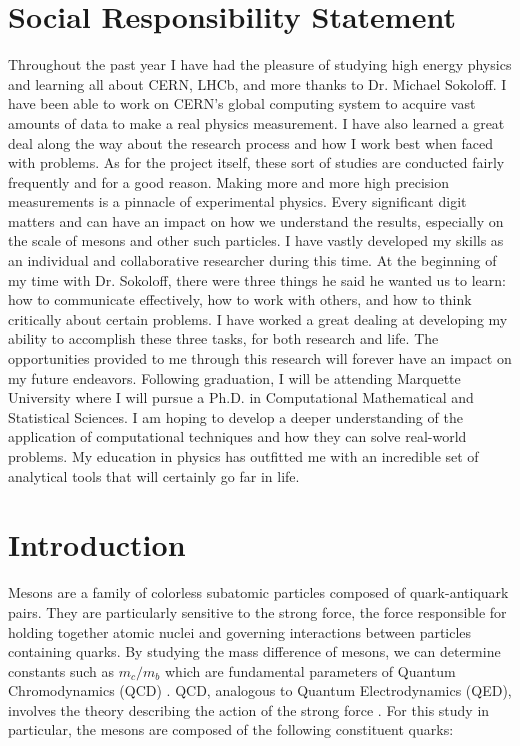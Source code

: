 \documentclass[12pt, letterpaper]{article}
\begin{document}
\section*{Social Responsibility Statement}
\begin{minipage}{0.9\textwidth}
    \baselineskip
Throughout the past year I have had the pleasure of studying high energy physics and learning all about CERN, LHCb, and more thanks to Dr. Michael Sokoloff. I have been able to work on CERN's global computing system to acquire vast amounts of data to make a real physics measurement. I have also learned a great deal along the way about the research process and how I work best when faced with problems. As for the project itself, these sort of studies are conducted fairly frequently and for a good reason. Making more and more high precision measurements is a pinnacle of experimental physics. Every significant digit matters and can have an impact on how we understand the results, especially on the scale of mesons and other such particles. I have vastly developed my skills as an individual and collaborative researcher during this time. At the beginning of my time with Dr. Sokoloff, there were three things he said he wanted us to learn: how to communicate effectively, how to work with others, and how to think critically about certain problems. I have worked a great dealing at developing my ability to accomplish these three tasks, for both research and life. The opportunities provided to me through this research will forever have an impact on my future endeavors. Following graduation, I will be attending Marquette University where I will pursue a Ph.D. in Computational Mathematical and Statistical Sciences. I am hoping to develop a deeper understanding of the application of computational techniques and how they can solve real-world problems. My education in physics has outfitted me with an incredible set of analytical tools that will certainly go far in life.


\end{minipage}








\newpage
\section{Introduction}
Mesons are a family of colorless subatomic particles composed of quark-antiquark pairs. They are particularly sensitive to the strong force, the force responsible for holding together atomic nuclei and governing interactions between particles containing quarks. By studying the mass difference of mesons, we can determine constants such as $m_c / m_b$ which are fundamental parameters of Quantum Chromodynamics (QCD) \cite{theory}. QCD, analogous to Quantum Electrodynamics (QED), involves the theory describing the action of the strong force \cite{QCD}. For this study in particular, the mesons are composed of the following constituent quarks:
\end{document}
